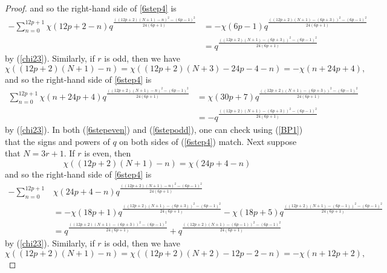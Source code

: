 \documentclass[11pt,reqno]{amsart}
\theoremstyle{definition}
\numberwithin{equation}{section}
\renewcommand{\=}{\;=\;}
\begin{document}
\begin{proof}
and so the right-hand side of \eqref{6step4} is
\begin{equation} \label{6stepeven}
\begin{aligned}
-\sum_{n=0}^{12p+1} \chi(12p+2-n) q^{\frac{((12p+2)(N+1) - n)^2 - (6p-1)^2}{24(6p+1)}} &= 
-\chi(6p-1) q^{\frac{((12p+2)(N+1) - (6p+3))^2 - (6p-1)^2}{24(6p+1)}} \\
&= q^{\frac{((12p+2)(N+1) - (6p+3))^2 - (6p-1)^2}{24(6p+1)}}
\end{aligned}
\end{equation}
by (\ref{chi23}). Similarly, if $r$ is odd, then we have  
\begin{equation*} \label{6step6}
\chi((12p+2)(N+1) - n)  =  \chi((12p+2)(N+3) - 24p-4-n) = -\chi(n+24p+4),
\end{equation*}
and so the right-hand side of \eqref{6step4} is
\begin{equation} \label{6stepodd}
\begin{aligned}
\sum_{n=0}^{12p+1} \chi(n+24p+4) q^{\frac{((12p+2)(N+1) - n)^2 - (6p-1)^2}{24(6p+1)}} &= 
\chi(30p+7) q^{\frac{((12p+2)(N+1) - (6p+3))^2 - (6p-1)^2}{24(6p+1)}} \\
&= -q^{\frac{((12p+2)(N+1) - (6p+3))^2 - (6p-1)^2}{24(6p+1)}}
\end{aligned}
\end{equation}
by (\ref{chi23}). In both (\ref{6stepeven}) and (\ref{6stepodd}), one can check using (\ref{BP1}) that the signs and powers of $q$ on both sides of (\ref{6step4}) match. Next suppose that $N=3r+1$.    If $r$ is even, then 
\begin{equation*} 
\chi((12p+2)(N+1) - n) = \chi(24p+4-n)
\end{equation*}
and so the right-hand side of \eqref{6step4} is
\begin{equation} \label{6stepeven1}
\begin{aligned}
-\sum_{n=0}^{12p+1}& \chi(24p+4-n) q^{\frac{((12p+2)(N+1) - n)^2 - (6p-1)^2}{24(6p+1)}} \\
&= 
-\chi(18p+1) q^{\frac{((12p+2)(N+1) - (6p+3))^2 - (6p-1)^2}{24(6p+1)}} - \chi(18p+5) q^{\frac{((12p+2)(N+1) - (6p-1))^2 - (6p-1)^2}{24(6p+1)}} \\
&= q^{\frac{((12p+2)(N+1) - (6p+3))^2 - (6p-1)^2}{24(6p+1)}} + q^{\frac{((12p+2)(N+1) - (6p-1))^2 - (6p-1)^2}{24(6p+1)}}
\end{aligned}
\end{equation}
by (\ref{chi23}). Similarly, if $r$ is odd, then we have
\begin{equation*} 
\chi((12p+2)(N+1) - n)  =  \chi((12p+2)(N+2) - 12p-2-n) = -\chi(n+12p+2),

\end{equation*}
\end{proof}
\end{document}
